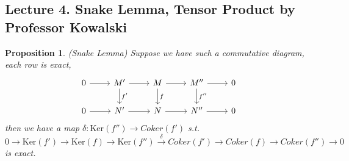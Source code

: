 \documentclass[11pt]{article}
\newtheorem{prop}[thm]{Proposition}
\newcommand{\rta}{\rightarrow}
\newcommand{\lrta}{\longrightarrow}
\begin{document}
\subsection{Lecture 4. Snake Lemma, Tensor Product by Professor Kowalski}
\begin{prop}(Snake Lemma)
Suppose we have such a commutative diagram, each row is exact, 
\[
\begin{tikzcd}
0\arrow[r]  & M'  \arrow[r]\arrow[d,"f'"] & M\arrow[r] \arrow[d,"f"] & M''\arrow[r] \arrow[d,"f''"] & 0 \\
0\arrow[r]  & N'  \arrow[r] & N\arrow[r] & N''\arrow[r]  & 0 
\end{tikzcd}
\]
then we have a map $\delta: \text{Ker}(f'')\lrta Coker(f')$ s.t.  
$$
0\lrta \text{Ker}(f')\lrta \text{Ker}(f)\rta \text{Ker}(f'')\overset{\delta}{\lrta}Coker(f')\lrta Coker(f)\lrta Coker(f'')\lrta 0 
$$
is exact.
\end{prop}
\end{document}
